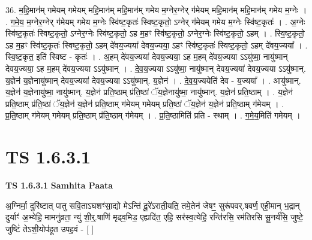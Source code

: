 \documentclass[17pt]{extarticle}
\begin{document}
36. म॒हि॒मान॑म् गमेयम् गमेयम् महि॒मान॑म् महि॒मान॑म् गमेय म॒ग्नेर॒ग्नेर् ग॑मेयम् महि॒मान॑म् महि॒मान॑म् गमेय म॒ग्नेः । . ग॒मे॒य॒ म॒ग्नेर॒ग्नेर् ग॑मेयम् गमेय म॒ग्नेः स्वि॑ष्ट॒कृतः॑ स्विष्ट॒कृतो॒ ऽग्नेर् ग॑मेयम् गमेय म॒ग्नेः स्वि॑ष्ट॒कृतः॑ । . अ॒ग्नेः स्वि॑ष्ट॒कृतः॑ स्विष्ट॒कृतो॒ ऽग्नेर॒ग्नेः स्वि॑ष्ट॒कृतो॒ ऽह म॒हꣳ स्वि॑ष्ट॒कृतो॒ ऽग्नेर॒ग्नेः स्वि॑ष्ट॒कृतो॒ ऽहम् । . स्वि॒ष्ट॒कृतो॒ ऽह म॒हꣳ स्वि॑ष्ट॒कृतः॑ स्विष्ट॒कृतो॒ ऽहम् दे॑वय॒ज्यया॑ देवय॒ज्यया॒ ऽहꣳ स्वि॑ष्ट॒कृतः॑ स्विष्ट॒कृतो॒ ऽहम् दे॑वय॒ज्यया᳚ । . स्वि॒ष्ट॒कृत॒ इति॑ स्विष्ट - कृतः॑ । . अ॒हम् दे॑वय॒ज्यया॑ देवय॒ज्यया॒ ऽह म॒हम् दे॑वय॒ज्यया ऽऽयु॑ष्मा॒ नायु॑ष्मान् देवय॒ज्यया॒ ऽह म॒हम् दे॑वय॒ज्यया ऽऽयु॑ष्मान् । . दे॒व॒य॒ज्यया ऽऽयु॑ष्मा॒ नायु॑ष्मान् देवय॒ज्यया॑ देवय॒ज्यया ऽऽयु॑ष्मान्. य॒ज्ञेन॑ य॒ज्ञेनायु॑ष्मान् देवय॒ज्यया॑ देवय॒ज्यया ऽऽयु॑ष्मान्. य॒ज्ञेन॑ । . दे॒व॒य॒ज्ययेति॑ देव - य॒ज्यया᳚ । . आयु॑ष्मान्. य॒ज्ञेन॑ य॒ज्ञेनायु॑ष्मा॒ नायु॑ष्मान्. य॒ज्ञेन॑ प्रति॒ष्ठाम् प्र॑ति॒ष्ठां ॅय॒ज्ञेनायु॑ष्मा॒ नायु॑ष्मान्. य॒ज्ञेन॑ प्रति॒ष्ठाम् । . य॒ज्ञेन॑ प्रति॒ष्ठाम् प्र॑ति॒ष्ठां ॅय॒ज्ञेन॑ य॒ज्ञेन॑ प्रति॒ष्ठाम् ग॑मेयम् गमेयम् प्रति॒ष्ठां ॅय॒ज्ञेन॑ य॒ज्ञेन॑ प्रति॒ष्ठाम् ग॑मेयम् । . प्र॒ति॒ष्ठाम् ग॑मेयम् गमेयम् प्रति॒ष्ठाम् प्र॑ति॒ष्ठाम् ग॑मेयम् । . प्र॒ति॒ष्ठामिति॑ प्रति - स्थाम् । . ग॒मे॒य॒मिति॑ गमेयम् । \newline
\pagebreak
{}

\section{ TS 1.6.3.1 }

\textbf{TS 1.6.3.1 } \newline
\textbf{Samhita Paata} \newline

अ॒ग्निर्मा॒ दुरि॑ष्टात् पातु सवि॒ताऽघशꣳ॑सा॒द्यो मेऽन्ति॑ दू॒रे॑ऽराती॒यति॒ तमे॒तेन॑ जेषꣳ॒॒ सुरू॑पवर्.षवर्ण॒ एही॒मान् भ॒द्रान् दुर्याꣳ॑ अ॒भ्येहि॒ मामनु॑व्रता॒ न्यु॑ शी॒र्॒.षाणि॑ मृढ्व॒मिड॒ एह्यदि॑त॒ एहि॒ सर॑स्व॒त्येहि॒ रन्ति॑रसि॒ रम॑तिरसि सू॒नर्य॑सि॒ जुष्टे॒ जुष्टिं॑ तेऽशी॒योप॑हूत उपह॒वं - [ ] \newline
\end{document}
